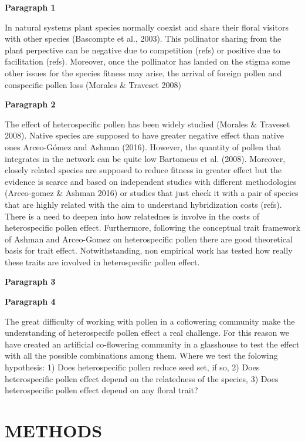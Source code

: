 \documentclass[11pt,a4paper]{article}
\begin{document}
\textbf{Paragraph 1}

In natural systems plant species normally coexist and share their floral
visitors with other species (Bascompte et al., 2003). This pollinator
sharing from the plant perpective can be negative due to competition
(refs) or positive due to facilitation (refs). Moreover, once the
pollinator has landed on the stigma some other issues for the species
fitness may arise, the arrival of foreign pollen and conspecific pollen
loss (Morales \& Traveset 2008)

\textbf{Paragraph 2}

The effect of heterospecific pollen has been widely studied (Morales \&
Traveset 2008). Native species are supposed to have greater negative
effect than native ones Arceo-Gómez and Ashman (2016). However, the
quantity of pollen that integrates in the network can be quite low
Bartomeus et al. (2008). Moreover, closely related species are supposed
to reduce fitness in greater effect but the evidence is scarce and based
on independent studies with different methodologies (Arceo-gomez \&
Ashman 2016) or studies that just check it with a pair of species that
are highly related with the aim to understand hybridization costs
(refs). There is a need to deepen into how relatednes is involve in the
costs of heterospecific pollen effect. Furthermore, following the
conceptual trait framework of Ashman and Arceo-Gomez on heterospecific
pollen there are good theoretical basis for trait effect.
Notwithstanding, non empirical work has tested how really these traits
are involved in heterospecific pollen effect.

\textbf{Paragraph 3}

\textbf{Paragraph 4}

The great difficulty of working with pollen in a coflowering community
make the understanding of heterospecifc pollen effect a real challenge.
For this reason we have created an artificial co-flowering community in
a glasshouse to test the effect with all the possible combinations among
them. Where we test the folowing hypothesis: 1) Does heterospecific
pollen reduce seed set, if so, 2) Does heterospecific pollen effect
depend on the relatedness of the species, 3) Does heterospecific pollen
effect depend on any floral trait?

\section{METHODS}\label{methods}
\end{document}
